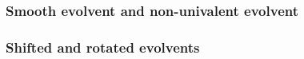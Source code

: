 \documentclass[aspectratio=1610]{beamer}
\begin{document}
\begin{frame}
  \frametitle{Smooth evolvent and non-univalent evolvent}
      \begin{figure}[ht]
      \end{figure}
\end{frame}

\begin{frame}
  \frametitle{Shifted and rotated evolvents}
  \begin{figure}[ht]
  \end{figure}
%
\end{frame}
\end{document}
